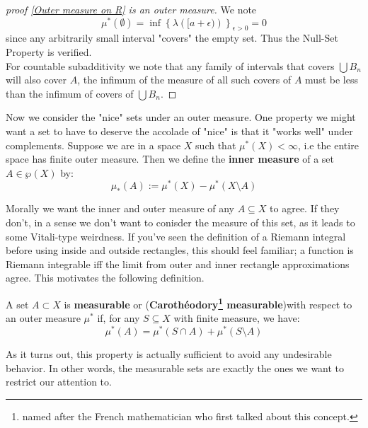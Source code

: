 \documentclass[11pt,x11names]{article}
\newcommand{\set}[1]{\left\{ #1 \right\}}
\renewcommand{\brack}[1]{\left(   #1 \right)}
\begin{document}
\begin{proof}[proof \ref{Outer measure on R} is an outer measure]
We note 
\begin{equation*}
    \mu^*(\emptyset) = \inf \set{\lambda\brack{[a + \epsilon)}}_{\epsilon > 0} = 0
\end{equation*}
since any arbitrarily small interval "covers" the empty set. Thus the Null-Set Property is verified.\\

For countable subadditivity we note that any family of intervals that covers $\bigcup B_n$ will also cover $A$, the infimum of the measure of all such covers of $A$ must be less than the infimum of covers of $\bigcup B_n$.
    
\end{proof}

Now we consider the "nice" sets under an outer measure. One property we might want a set to have to deserve the accolade of "nice" is that it "works well" under complements. Suppose we are in a space $X$ such that $\mu^*(X) < \infty$, i.e the entire space has finite outer measure. Then we define the \textbf{inner measure} of a set $A \in \wp(X)$ by:
\begin{equation*}
    \mu_*(A) := \mu^*(X) - \mu^*(X \setminus A)
\end{equation*}

Morally we want the inner and outer measure of any $A \subseteq X$ to agree. If they don't, in a sense we don't want to conisder the measure of this set, as it leads to some Vitali-type weirdness. If you've seen the definition of a Riemann integral before using inside and outside rectangles, this should feel familiar; a function is Riemann integrable iff the limit from outer and inner rectangle approximations agree. This motivates the following definition.

\begin{defn}
    A set $A \subset X$ is \textbf{measurable} or (\textbf{Caroth\'eodory\footnote{named after the French mathematician who first talked about this concept.} measurable})with respect to an outer measure $\mu^*$ if, for any $S \subseteq X$ with finite measure, we have:
    \begin{equation*}
        \mu^*(A) = \mu^*(S \cap A) + \mu^*(S \setminus A) 
    \end{equation*}
\end{defn}

As it turns out, this property is actually sufficient to avoid any undesirable behavior. In other words, the measurable sets are exactly the ones we want to restrict our attention to.
\end{document}
